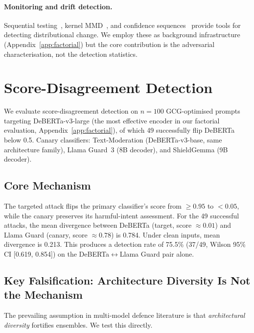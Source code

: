 \documentclass{article}
\begin{document}
\paragraph{Monitoring and drift detection.} Sequential testing~\citep{wald1945sequential}, kernel MMD~\citep{gretton2012kernel}, and confidence sequences~\citep{howard2021timeuniform} provide tools for detecting distributional change. We employ these as background infrastructure (Appendix~\ref{app:factorial}) but the core contribution is the adversarial characterisation, not the detection statistics.


\section{Score-Disagreement Detection}
\label{sec:detection}

We evaluate score-disagreement detection on $n{=}100$ GCG-optimised prompts targeting DeBERTa-v3-large (the most effective encoder in our factorial evaluation, Appendix~\ref{app:factorial}), of which 49 successfully flip DeBERTa below 0.5. Canary classifiers: Text-Moderation (DeBERTa-v3-base, same architecture family), Llama Guard~3 (8B decoder), and ShieldGemma (9B decoder).

\subsection{Core Mechanism}

The targeted attack flips the primary classifier's score from $\geq 0.95$ to $< 0.05$, while the canary preserves its harmful-intent assessment. For the 49 successful attacks, the mean divergence between DeBERTa (target, score $\approx 0.01$) and Llama Guard (canary, score $\approx 0.78$) is 0.784. Under clean inputs, mean divergence is 0.213. This produces a detection rate of 75.5\% (37/49, Wilson 95\% CI [0.619, 0.854]) on the DeBERTa$\leftrightarrow$Llama Guard pair alone.

\subsection{Key Falsification: Architecture Diversity Is Not the Mechanism}
\label{sec:ca4}

The prevailing assumption in multi-model defence literature is that \emph{architectural diversity} fortifies ensembles. We test this directly.
\end{document}
